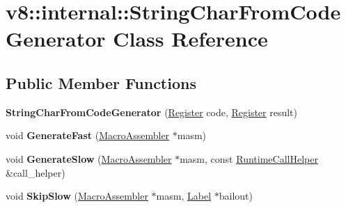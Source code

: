 \hypertarget{classv8_1_1internal_1_1_string_char_from_code_generator}{}\section{v8\+:\+:internal\+:\+:String\+Char\+From\+Code\+Generator Class Reference}
\label{classv8_1_1internal_1_1_string_char_from_code_generator}
\subsection*{Public Member Functions}
\begin{DoxyCompactItemize}
\item 
{\bfseries String\+Char\+From\+Code\+Generator} (\hyperlink{structv8_1_1internal_1_1_register}{Register} code, \hyperlink{structv8_1_1internal_1_1_register}{Register} result)\hypertarget{classv8_1_1internal_1_1_string_char_from_code_generator_aeed226f9954bf9d526c4b6116aacfc0c}{}\label{classv8_1_1internal_1_1_string_char_from_code_generator_aeed226f9954bf9d526c4b6116aacfc0c}

\item 
void {\bfseries Generate\+Fast} (\hyperlink{classv8_1_1internal_1_1_macro_assembler}{Macro\+Assembler} $\ast$masm)\hypertarget{classv8_1_1internal_1_1_string_char_from_code_generator_a46b894ffbc5a4aed0858cfc9d927e995}{}\label{classv8_1_1internal_1_1_string_char_from_code_generator_a46b894ffbc5a4aed0858cfc9d927e995}

\item 
void {\bfseries Generate\+Slow} (\hyperlink{classv8_1_1internal_1_1_macro_assembler}{Macro\+Assembler} $\ast$masm, const \hyperlink{classv8_1_1internal_1_1_runtime_call_helper}{Runtime\+Call\+Helper} \&call\+\_\+helper)\hypertarget{classv8_1_1internal_1_1_string_char_from_code_generator_af303b2427779d7359451eec05807c018}{}\label{classv8_1_1internal_1_1_string_char_from_code_generator_af303b2427779d7359451eec05807c018}

\item 
void {\bfseries Skip\+Slow} (\hyperlink{classv8_1_1internal_1_1_macro_assembler}{Macro\+Assembler} $\ast$masm, \hyperlink{classv8_1_1internal_1_1_label}{Label} $\ast$bailout)\hypertarget{classv8_1_1internal_1_1_string_char_from_code_generator_a670e4c0bf49709c60f6d369df49fadbc}{}\label{classv8_1_1internal_1_1_string_char_from_code_generator_a670e4c0bf49709c60f6d369df49fadbc}

\end{DoxyCompactItemize}
